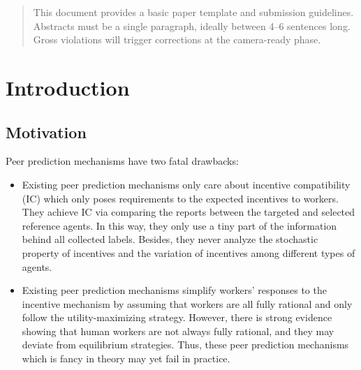 \documentclass{article}
\begin{document}

\begin{abstract}
This document provides a basic paper template and submission guidelines.
Abstracts must be a single paragraph, ideally between 4--6 sentences long.
Gross violations will trigger corrections at the camera-ready phase.
\end{abstract}

\section{Introduction}
\subsection{Motivation}
Peer prediction mechanisms have two fatal drawbacks:
\begin{itemize}
\item Existing peer prediction mechanisms only care about incentive compatibility (IC) which only poses requirements to the expected incentives to workers. They achieve IC via comparing the reports between the targeted and selected reference agents. In this way, they only use a tiny part of the information behind all collected labels. Besides, they never analyze the stochastic property of incentives and the variation of incentives among different types of agents.
\item Existing peer prediction mechanisms simplify workers' responses to the incentive mechanism by assuming that workers are all fully rational and only follow the utility-maximizing strategy. However, there is strong evidence showing that human workers are not always fully rational, and they may deviate from equilibrium strategies. Thus, these peer prediction mechanisms which is fancy in theory may yet fail in practice.
\end{itemize}
\end{document}
